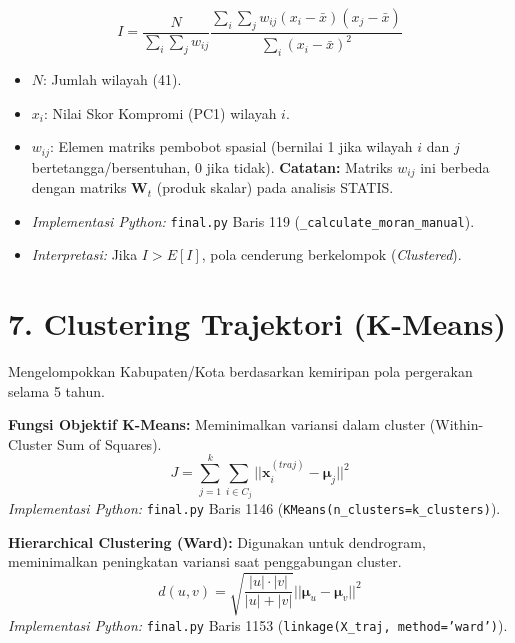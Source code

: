 \begin{equation}
    I = \frac{N}{\sum_i \sum_j w_{ij}} \frac{\sum_i \sum_j w_{ij} (x_i - \bar{x})(x_j - \bar{x})}{\sum_i (x_i - \bar{x})^2}
\end{equation}

\begin{itemize}
    \item $N$: Jumlah wilayah (41).
    \item $x_i$: Nilai Skor Kompromi (PC1) wilayah $i$.
    \item $w_{ij}$: Elemen matriks pembobot spasial (bernilai 1 jika wilayah $i$ dan $j$ bertetangga/bersentuhan, 0 jika tidak). \textbf{Catatan:} Matriks $w_{ij}$ ini berbeda dengan matriks $\mathbf{W}_t$ (produk skalar) pada analisis STATIS.
    \item \textit{Implementasi Python:} \texttt{final.py} Baris 119 (\texttt{\_calculate\_moran\_manual}).
    \item \textit{Interpretasi:} Jika $I > E[I]$, pola cenderung berkelompok (\textit{Clustered}).
\end{itemize}

\section*{7. Clustering Trajektori (K-Means)}
Mengelompokkan Kabupaten/Kota berdasarkan kemiripan pola pergerakan selama 5 tahun.

\textbf{Fungsi Objektif K-Means:}
Meminimalkan variansi dalam cluster (Within-Cluster Sum of Squares).
\begin{equation}
    J = \sum_{j=1}^{k} \sum_{i \in C_j} ||\mathbf{x}_i^{(traj)} - \boldsymbol{\mu}_j||^2
\end{equation}
\textit{Implementasi Python:} \texttt{final.py} Baris 1146 (\texttt{KMeans(n\_clusters=k\_clusters)}).

\textbf{Hierarchical Clustering (Ward):}
Digunakan untuk dendrogram, meminimalkan peningkatan variansi saat penggabungan cluster.
\begin{equation}
    d(u,v) = \sqrt{\frac{|u| \cdot |v|}{|u| + |v|}} ||\boldsymbol{\mu}_u - \boldsymbol{\mu}_v||^2
\end{equation}
\textit{Implementasi Python:} \texttt{final.py} Baris 1153 (\texttt{linkage(X\_traj, method='ward')}).
